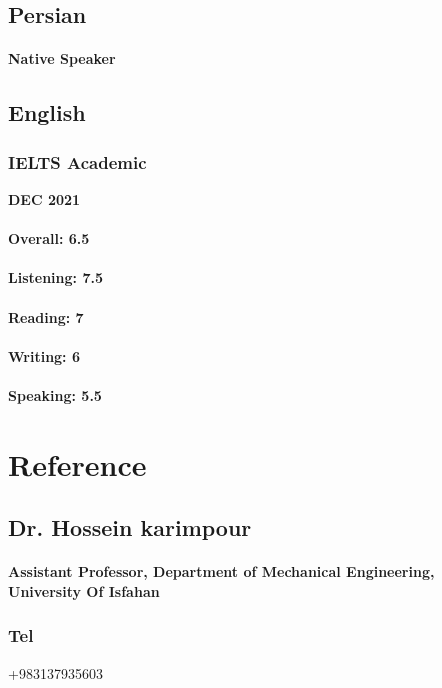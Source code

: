 \documentclass[a4paper]{article}
\begin{document}
    \subsection{Persian}
        \paragraph{Native Speaker}

    \subsection{English}
        \subsubsection{IELTS Academic}
        \hfill
        {\bfseries DEC 2021}
        \paragraph{Overall: 6.5}
        \paragraph{Listening: 7.5}
        \paragraph{Reading: 7}
        \paragraph{Writing: 6}
        \paragraph{Speaking: 5.5}

    \section{Reference}

        \subsection{Dr. Hossein karimpour}
        \paragraph{\bfseries Assistant Professor, Department of Mechanical Engineering, University Of Isfahan}

        \subsubsection{\large Tel} {\large +983137935603}
        
\end{document}
